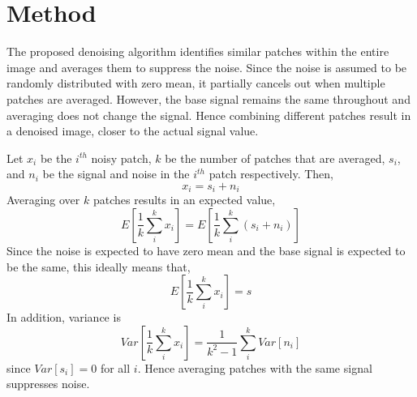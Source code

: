 \documentclass[fleqn,10pt]{wlscirep}
\begin{document}
	
	\section*{Method}
	
	The proposed denoising algorithm identifies similar patches within the entire image and averages them to suppress the noise. Since the noise is assumed to be randomly distributed with zero mean, it partially cancels out when multiple patches are averaged. However, the base signal remains the same throughout and averaging does not change the signal. Hence combining different patches result in a denoised image, closer to the actual signal value. 
	
	Let $x_{i}$ be the $i^{th}$ noisy patch, $k$ be the number of patches that are averaged, $s_i$, and $n_i$ be the signal and noise in the $i^{th}$ patch respectively. Then,
	\begin{equation}
		x_i = s_i + n_i
	\end{equation}
	Averaging over $k$ patches results in an expected value,
	\begin{equation}
		E\left[\frac{1}{k}\sum_{i}^{k}x_i \right] = E\left[\frac{1}{k}\sum_{i}^{k}(s_i + n_i) \right]
	\end{equation}
	Since the noise is expected to have zero mean and the base signal is expected to be the same, this ideally means that,
	\begin{equation}
		E\left[\frac{1}{k}\sum_{i}^{k}x_i \right] = s
	\end{equation}
	In addition, variance is 
	\begin{equation}
		Var\left[\frac{1}{k}\sum_{i}^{k}x_i \right] = \frac{1}{k^2 -1} \sum_{i}^{k}Var\left[n_i\right]
	\end{equation}
	since $Var[s_i] = 0$ for all $i$. Hence averaging patches with the same signal suppresses noise.
	

	
	
	
\end{document}
